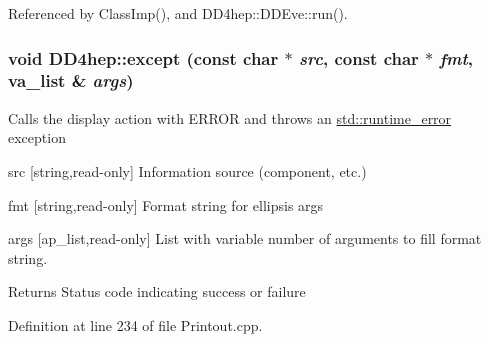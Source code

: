 Referenced by ClassImp(), and DD4hep::DDEve::run().\hypertarget{namespace_d_d4hep_a0ecfb76ddfb873affe80600e3d8912dd}{
\subsubsection[{except}]{\setlength{\rightskip}{0pt plus 5cm}void DD4hep::except (const char $\ast$ {\em src}, \/  const char $\ast$ {\em fmt}, \/  va\_\-list \& {\em args})}}
\label{namespace_d_d4hep_a0ecfb76ddfb873affe80600e3d8912dd}
Calls the display action with ERROR and throws an \hyperlink{classstd_1_1runtime__error}{std::runtime\_\-error} exception \begin{DoxyItemize}
\item src \mbox{[}string,read-\/only\mbox{]} Information source (component, etc.) \item fmt \mbox{[}string,read-\/only\mbox{]} Format string for ellipsis args \item args \mbox{[}ap\_\-list,read-\/only\mbox{]} List with variable number of arguments to fill format string. \begin{DoxyReturn}{Returns}
Status code indicating success or failure 
\end{DoxyReturn}
\end{DoxyItemize}


Definition at line 234 of file Printout.cpp.

